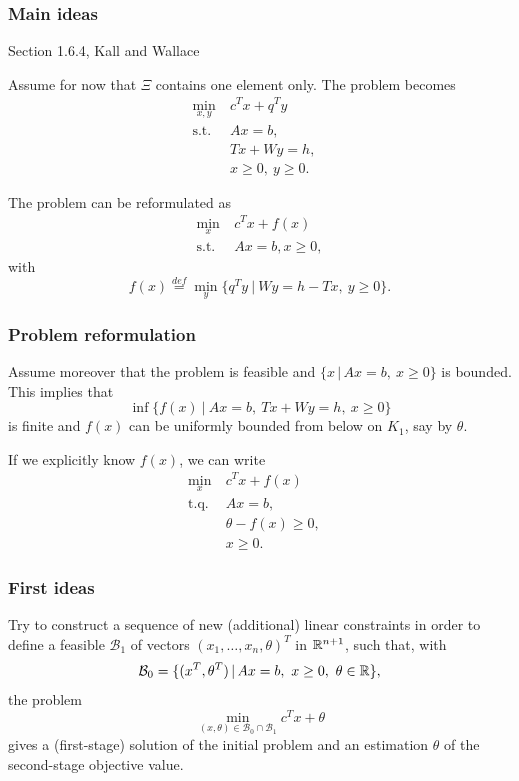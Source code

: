 \documentclass{beamer}
\begin{document}
\begin{frame}
\frametitle{Main ideas}

{\red Section 1.6.4, Kall and Wallace}

Assume for now that $\Xi$ contains one element only.
The problem becomes
\begin{align*}
\min_{x,y}\ & c^Tx + q^Ty & \\
\mbox{s.t. } & Ax = b, \\
& Tx + Wy = h, \\
& x \geq 0,\ y \geq 0.
\end{align*}

\mbox{}

The problem can be reformulated as
\begin{align*}
\min_x\ & c^Tx + f(x) \\
\mbox{s.t. } & Ax = b, x \geq 0,
\end{align*}
with
\[
f(x) \overset{def}{=} \min_y \lbrace q^Ty \ |\ Wy = h - Tx,\ y \geq 0 \rbrace.
\]

\end{frame}

\begin{frame}
\frametitle{Problem reformulation}

Assume moreover that the problem is feasible and $\lbrace x \,|\, Ax = b,\ x \geq 0 \rbrace$ is bounded. This implies that
\[
\inf \lbrace f(x) \ |\ Ax = b,\ Tx+Wy =h,\ x \geq 0 \rbrace
\]
is finite and $f(x)$ can be uniformly bounded from below on $K_1$, say by $\theta$.

\mbox{}

If we explicitly know $f(x)$, we can write
\begin{align*}
\min_x\ & c^Tx + f(x) & \\
\mbox{t.q. } & Ax = b, \\
& \theta - f(x) \geq 0, \\
& x \geq 0.
\end{align*}

\end{frame}

\begin{frame}
\frametitle{First ideas}

Try to construct a {\blue sequence of new (additional) linear constraints} in order to define a feasible $\mathcal{B}_1$ of vectors $(x_1,\ldots,x_n,\theta)^T$ in ${\mathbb{R}}^{n+1}$, such that, with
\[
\mathcal{B}_0 = \lbrace (x^T, \theta^T) \,|\, Ax = b,\ x \geq 0,\
\theta \in {\mathbb{R}} \rbrace,
\]
the problem
\[
\min_{(x,\theta) \in \mathcal{B}_0 \cap \mathcal{B}_1} c^Tx+\theta
\]
gives a (first-stage) solution of the initial problem and an estimation $\theta$ of the second-stage objective value.

\end{frame}
\end{document}
